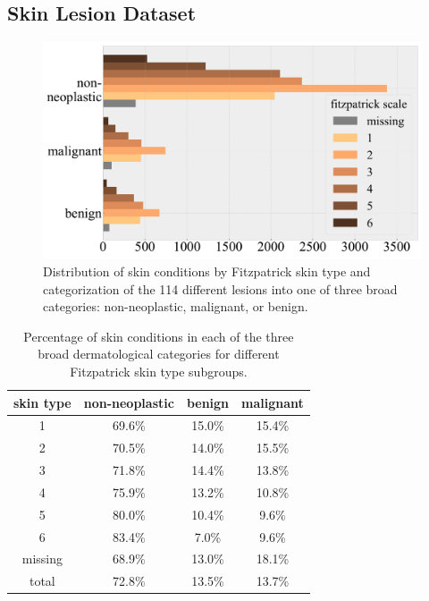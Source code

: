 \documentclass[letterpaper]{article} %
\begin{document}
    \subsection{Skin Lesion Dataset}
        \begin{figure}[t]
        \centering
        \includegraphics[width=0.99\columnwidth]{LaTeX/fitz-subgroup-class-dist.pdf}
        \caption{Distribution of skin conditions by Fitzpatrick skin type and categorization of the 114 different lesions into one of three broad categories: non-neoplastic, malignant, or benign.}
        \label{fig:fitz-dist}
        \end{figure}
        
        \begin{table}[t]
        \small
        \centering
        \begin{tabular}{cccc}
        \toprule
        \textbf{skin type} & \bf{non-neoplastic} & \bf{benign} & \bf{malignant} \\
        \midrule
        1 & 69.6\% & 15.0\% & 15.4\% \\
        2 & 70.5\% & 14.0\% & 15.5\% \\
        3 & 71.8\% & 14.4\% & 13.8\% \\
        4 & 75.9\% & 13.2\% & 10.8\% \\
        5 & 80.0\% & 10.4\% & 9.6\% \\
        6 & 83.4\% & 7.0\% & 9.6\% \\
        missing & 68.9\% & 13.0\% & 18.1\% \\
        \midrule
        total & 72.8\% & 13.5\% & 13.7\% \\
        \bottomrule
        \end{tabular}
        \caption{Percentage of skin conditions in each of the three broad dermatological categories for different Fitzpatrick skin type subgroups.}
        \label{tab:disease-prevalence}
        \end{table}
        
\end{document}
